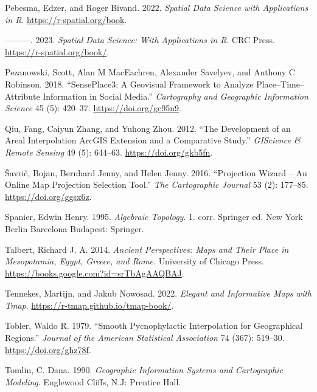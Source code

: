 \documentclass[
  letterpaper,
]{krantz}
\newlength{\cslhangindent}
\newenvironment{CSLReferences}[2] %
 {\begin{list}{}{%
  \setlength{\itemindent}{0pt}
  \setlength{\leftmargin}{0pt}
  \setlength{\parsep}{0pt}
  \ifodd #1
   \setlength{\leftmargin}{\cslhangindent}
   \setlength{\itemindent}{-1\cslhangindent}
  \fi
  \setlength{\itemsep}{#2\baselineskip}}}
 {\end{list}}
\begin{document}
\begin{CSLReferences}{1}{0}
Pebesma, Edzer, and Roger Bivand. 2022. \emph{Spatial {Data Science}
with Applications in {R}}. \url{https://r-spatial.org/book}.

---------. 2023. \emph{Spatial {Data Science}: {With Applications} in
{R}}. {CRC Press}. \url{https://r-spatial.org/book/}.

Pezanowski, Scott, Alan M MacEachren, Alexander Savelyev, and Anthony C
Robinson. 2018. {``{SensePlace3}: A Geovisual Framework to Analyze
Place--Time--Attribute Information in Social Media.''} \emph{Cartography
and Geographic Information Science} 45 (5): 420--37.
\url{https://doi.org/gc95n9}.

Qiu, Fang, Caiyun Zhang, and Yuhong Zhou. 2012. {``The {Development} of
an {Areal Interpolation ArcGIS Extension} and a {Comparative Study}.''}
\emph{GIScience \& Remote Sensing} 49 (5): 644--63.
\url{https://doi.org/gkb5fn}.

Šavrič, Bojan, Bernhard Jenny, and Helen Jenny. 2016. {``Projection
{Wizard} -- {An Online Map Projection Selection Tool}.''} \emph{The
Cartographic Journal} 53 (2): 177--85. \url{https://doi.org/ggsx6z}.

Spanier, Edwin Henry. 1995. \emph{Algebraic Topology}. 1. corr. Springer
ed. {New York Berlin Barcelona Budapest}: {Springer}.

Talbert, Richard J. A. 2014. \emph{Ancient {Perspectives}: {Maps} and
{Their Place} in {Mesopotamia}, {Egypt}, {Greece}, and {Rome}}.
{University of Chicago Press}.
\url{https://books.google.com?id=srTbAgAAQBAJ}.

Tennekes, Martijn, and Jakub Nowosad. 2022. \emph{Elegant and
Informative Maps with Tmap}. \url{https://r-tmap.github.io/tmap-book/}.

Tobler, Waldo R. 1979. {``Smooth {Pycnophylactic Interpolation} for
{Geographical Regions}.''} \emph{Journal of the American Statistical
Association} 74 (367): 519--30. \url{https://doi.org/ghz78f}.

Tomlin, C. Dana. 1990. \emph{Geographic Information Systems and
Cartographic Modeling}. {Englewood Cliffs, N.J}: {Prentice Hall}.


\end{CSLReferences}
\end{document}

